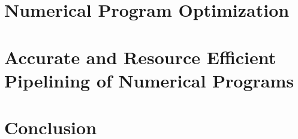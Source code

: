 \chapter{Numerical Program Optimization}
\label{chp:progopt}












\chapter{Accurate and Resource Efficient Pipelining of Numerical Programs}
\label{chp:latopt}











\chapter{Conclusion}
\label{chp:conclusion}



\cleardoublepage{}


{%
\renewcommand{\bibfont}{\normalfont\small}
\setlength{\biblabelsep}{0pt}
\setlength{\bibitemsep}{0.5\baselineskip plus 0.5\baselineskip}
\printbibliography[]
}

% 

% 

\begin{appendices}
    \addappheadtotoc%
    \makeatletter
    \makeatother
    
    
    
\end{appendices}


